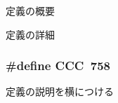 定義の概要 

定義の詳細 \hypertarget{group__モジュール名__サブモジュール名_gaac3f153b43e30e4004c50123561bb145}{
\subsubsection[{C\+C\+C}]{\setlength{\rightskip}{0pt plus 5cm}\#define C\+C\+C~758}}\label{group__モジュール名__サブモジュール名_gaac3f153b43e30e4004c50123561bb145}
定義の説明を横につける 